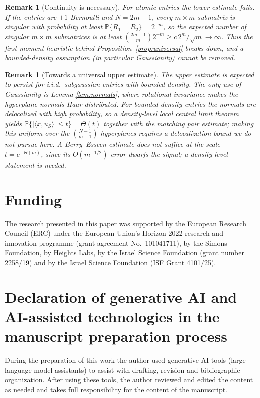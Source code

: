 \documentclass[preprint,12pt]{elsarticle}
\newtheorem{remark}[theorem]{Remark}
\newcommand{\PP}{\mathbb{P}}
\begin{document}
\begin{remark}[Continuity is necessary]\label{rem:bernoulli}
For atomic entries the lower estimate fails. If the entries are $\pm1$ Bernoulli and $N=2m-1$, every
$m\times m$ submatrix is singular with probability at least $\PP\{R_1=R_2\}=2^{-m}$, so the expected
number of singular $m\times m$ submatrices is at least $\binom{2m-1}{m}2^{-m}\ge c\,2^m/\sqrt m\to\infty$.
Thus the first-moment heuristic behind Proposition~\ref{prop:universal} breaks down, and a
bounded-density assumption (in particular Gaussianity) cannot be removed.
\end{remark}

\begin{remark}[Towards a universal upper estimate]\label{rem:univ-upper}
The upper estimate is expected to persist for i.i.d.\ subgaussian entries with bounded density. The
only use of Gaussianity is Lemma \ref{lem:normals}, where rotational invariance makes the hyperplane
normals Haar-distributed. For bounded-density entries the normals are delocalized with high
probability, so a density-level local central limit theorem yields $\PP\{|\langle x,u_S\rangle|\le
t\}=\Theta(t)$ together with the matching pair estimate; making this uniform over the $\binom{N-1}{m-1}$
hyperplanes requires a delocalization bound we do not pursue here. A Berry--Esseen estimate does not
suffice at the scale $t=e^{-\Theta(m)}$, since its $O(m^{-1/2})$ error dwarfs the signal; a
density-level statement is needed.
\end{remark}




\section*{Funding}
The research presented in this paper was supported by the European Research Council (ERC) under the
European Union's Horizon 2022 research and innovation programme (grant agreement No.~101041711), by the
Simons Foundation, by Heights Labs, by the Israel Science Foundation (grant number 2258/19) and by the Israel Science
Foundation (ISF Grant 4101/25).

\section*{Declaration of generative AI and AI-assisted technologies in the manuscript preparation process}
During the preparation of this work the author used generative AI tools (large language model
assistants) to assist with drafting, revision and bibliographic organization. After using these tools,
the author reviewed and edited the content as needed and takes full responsibility for the content of
the manuscript.
\end{document}
